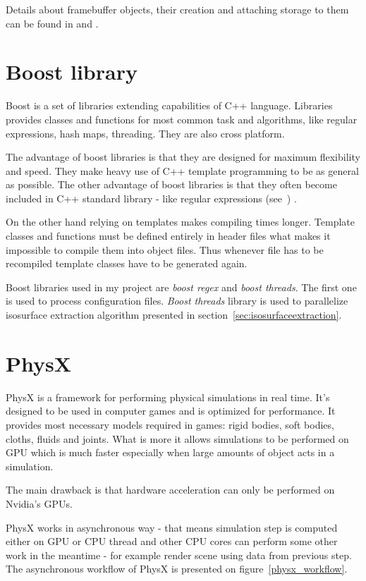 Details about framebuffer objects, their creation and attaching storage to them can be found in \cite[chapter~8]{OpenGLSuperbible} and \cite[chapter~10]{RedBook}.

\section{Boost library}
Boost is a set of libraries extending capabilities of C++ language. Libraries provides classes and functions for most common task and algorithms, like regular expressions, hash maps, threading. They are also cross platform. 

The advantage of boost libraries is that they are designed for maximum flexibility and speed. They make heavy use of C++ template programming to be as general as possible. The other advantage of boost libraries is that they often become included in C++ standard library - like regular expressions (see~\cite{CppRef}) . 

On the other hand relying on templates makes compiling times longer. Template classes and functions must be defined entirely in header files what makes it impossible to compile them into object files. Thus whenever file has to be recompiled template classes have to be generated again.

Boost libraries used in my project are \textit{boost regex} and \textit{boost threads}. The first one is used to process configuration files. \textit{Boost threads} library is used to parallelize isosurface extraction algorithm presented in section~\ref{sec:isosurfaceextraction}.

\section{PhysX}

PhysX is a framework for performing physical simulations in real time. It's designed to be used in computer games and is optimized for performance. It provides most necessary models required in games: rigid bodies, soft bodies, cloths, fluids and joints. What is more it allows simulations to be performed on GPU which is much faster especially when large amounts of object acts in a simulation.

The main drawback is that hardware acceleration can only be performed on Nvidia's GPUs. 

PhysX works in asynchronous way - that means simulation step is computed either on GPU or CPU thread and other CPU cores can perform some other work in the meantime - for example render scene using data from previous step. The asynchronous workflow of PhysX is presented on figure~\ref{physx_workflow}.

